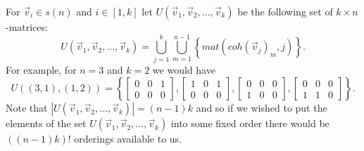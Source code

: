 \documentclass{article}
\begin{document}
\label{def:U}For $\vec v_i\in s(n)$ and $i \in [1,k]$  let $U(\vec v_1, \vec v_2, \ldots, \vec v_k)$ be the following set of $k\times n$-matrices:
$$ U(\vec v_1, \vec v_2, \ldots, \vec v_k)
=
\bigcup_{j=1}^k \bigcup_{m=1}^{n-1}\left\{ mat(coh(\vec v_j)_m, j) \right\}.
$$
For example, for $n=3$ and $k=2$ we would have
$$U((3,1), (1,2)) = \left\{
\begin{bmatrix}
0 & 0 & 1 \\
0 & 0 & 0
\end{bmatrix},
\begin{bmatrix}
1 & 0 & 1 \\
0 & 0 & 0
\end{bmatrix},
\begin{bmatrix}
0 & 0 & 0 \\
1 & 0 & 0
\end{bmatrix},
\begin{bmatrix}
0 & 0 & 0 \\
1 & 1 & 0 
\end{bmatrix}
\right\}
.$$
Note that $|U(\vec v_1, \vec v_2, \ldots, \vec v_k)|=(n-1)k$ and so if we wished to put the elements of the set $U(\vec v_1, \vec v_2, \ldots, \vec v_k)$ into some fixed order there would be $((n-1)k)!$ orderings available to us.
\end{document}
